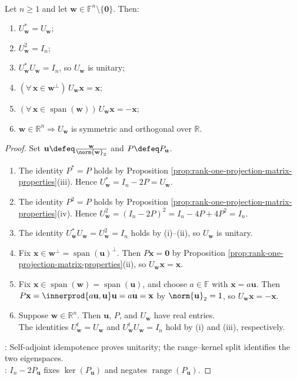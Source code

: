 \begin{theorem} \label{thm:householder-matrix-properties} \\
Let $n\geq1$ and let $\mathbf{w}\in\mathbb{F}^n\setminus\{\mathbf{0}\}$. Then:
\begin{enumerate}[label=(\roman*)]
\setlength{\itemsep}{0pt}
\item $U_{\mathbf{w}}^*=U_{\mathbf{w}}$;
\item $U_{\mathbf{w}}^2=I_n$;
\item $U_{\mathbf{w}}^*U_{\mathbf{w}}=I_n$, so $U_{\mathbf{w}}$ is unitary;
\item $(\forall\,\mathbf{x}\in\mathbf{w}^{\perp})\,U_{\mathbf{w}}\mathbf{x}=\mathbf{x}$;
\item $(\forall\,\mathbf{x}\in\operatorname{span}(\mathbf{w}))\,U_{\mathbf{w}}\mathbf{x}=-\mathbf{x}$;
\item $\mathbf{w}\in\mathbb{R}^n\Longrightarrow U_{\mathbf{w}}$ is symmetric and orthogonal over $\mathbb{R}$.
\end{enumerate}
\begin{proof}
Set $\mathbf{u}\defeq\frac{\mathbf{w}}{\norm{\mathbf{w}}_2}$ and $P\defeq P_{\mathbf{u}}$.
\begin{enumerate}[label=(\roman*)]
\setlength{\itemsep}{0pt}
\item The identity $P^*=P$ holds by Proposition \ref{prop:rank-one-projection-matrix-properties}(iii). Hence $U_{\mathbf{w}}^*=I_n-2P=U_{\mathbf{w}}$.
\item The identity $P^2=P$ holds by Proposition \ref{prop:rank-one-projection-matrix-properties}(iv). Hence $U_{\mathbf{w}}^2=(I_n-2P)^2=I_n-4P+4P^2=I_n$.
\item The identity $U_{\mathbf{w}}^*U_{\mathbf{w}}=U_{\mathbf{w}}^2=I_n$ holds by (i)--(ii), so $U_{\mathbf{w}}$ is unitary.
\item Fix $\mathbf{x}\in\mathbf{w}^{\perp}=\operatorname{span}(\mathbf{u})^{\perp}$. Then $P\mathbf{x}=\mathbf{0}$ by Proposition \ref{prop:rank-one-projection-matrix-properties}(ii), so $U_{\mathbf{w}}\mathbf{x}=\mathbf{x}$.
\item Fix $\mathbf{x}\in\operatorname{span}(\mathbf{w})=\operatorname{span}(\mathbf{u})$, and choose $a\in\mathbb{F}$ with $\mathbf{x}=a\mathbf{u}$. Then $P\mathbf{x}=\innerprod{a\mathbf{u},\mathbf{u}}\mathbf{u}=a\mathbf{u}=\mathbf{x}$ by $\norm{\mathbf{u}}_2=1$, so $U_{\mathbf{w}}\mathbf{x}=-\mathbf{x}$.
\item Suppose $\mathbf{w}\in\mathbb{R}^n$. Then $\mathbf{u}$, $P$, and $U_{\mathbf{w}}$ have real entries.\\
The identities $U_{\mathbf{w}}^t=U_{\mathbf{w}}$ and $U_{\mathbf{w}}^tU_{\mathbf{w}}=I_n$ hold by (i) and (iii), respectively.
\end{enumerate}
: Self-adjoint idempotence proves unitarity; the range--kernel split identifies the two eigenspaces.\\
: $I_n-2P_{\mathbf{u}}$ fixes $\ker(P_{\mathbf{u}})$ and negates $\operatorname{range}(P_{\mathbf{u}})$.
\end{proof}
\end{theorem}

